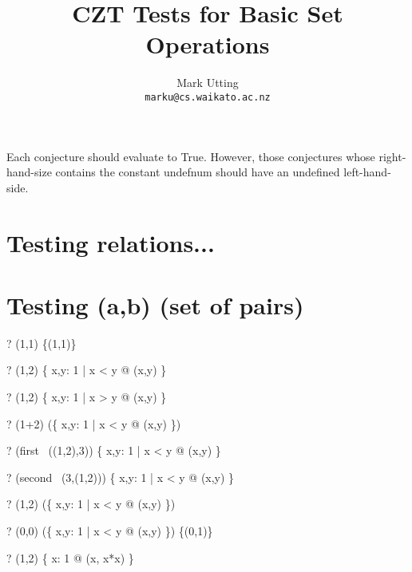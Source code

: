 \documentclass{article}
\title{CZT Tests for Basic Set Operations}
\author{Mark Utting \\ \texttt{marku@cs.waikato.ac.nz}}
\begin{document}
\maketitle

Each conjecture should evaluate to True.
However, those conjectures whose right-hand-size contains
the constant undefnum should have an undefined left-hand-side.


\section{Testing relations...}

\section{Testing (a,b) \in (set of pairs)}
\begin{zed} \vdash? (1,1) \in \{(1,1)\} \end{zed}
\begin{zed} \vdash? (1,2) \in \{ x,y: 1  | x < y @ (x,y) \} \end{zed}
\begin{zed} \vdash? (1,2) \notin \{ x,y: 1  | x > y @ (x,y) \} \end{zed}
\begin{zed} \vdash? (1+2) \in (\ran \{ x,y: 1  | x < y @ (x,y) \}) \end{zed}
\begin{zed} \vdash? (first~ ((1,2),3)) \in \{ x,y: 1  | x < y @ (x,y) \} \end{zed}
\begin{zed} \vdash? (second~ (3,(1,2))) \in \{ x,y: 1  | x < y @ (x,y) \} \end{zed}
\begin{zed} \vdash? (1,2) \in    (\{ x,y: 1  | x < y @ (x,y) \}) \cup \emptyset \end{zed}
\begin{zed} \vdash? (0,0) \notin (\{ x,y: 1  | x < y @ (x,y) \}) \cap \{(0,1)\} \end{zed}
\begin{zed} \vdash? (1,2) \notin \{ x: 1  @ (x, x*x) \} \end{zed}
\end{document}
